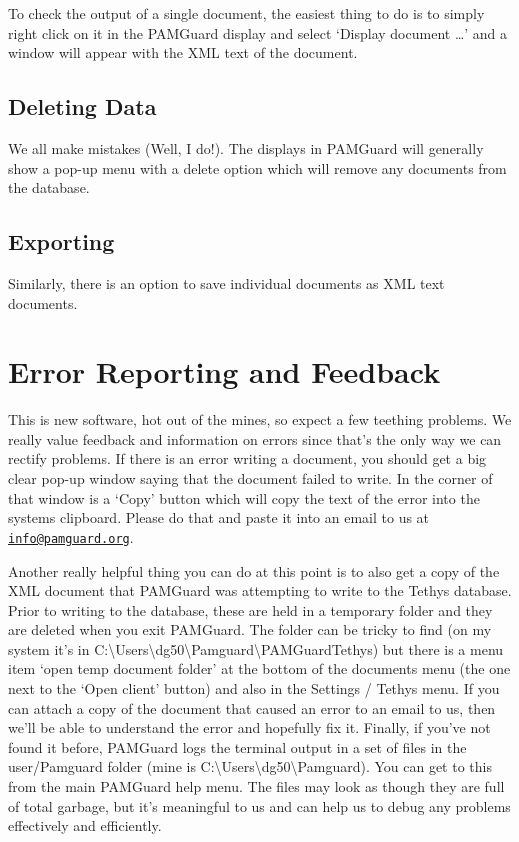 \documentclass[
]{article}
\begin{document}
To check the output of a single document, the easiest thing to do is to
simply right click on it in the PAMGuard display and select `Display
document \ldots{}' and a window will appear with the XML text of the
document.

\subsection{Deleting Data}\label{deleting-data}

We all make mistakes (Well, I do!). The displays in PAMGuard will
generally show a pop-up menu with a delete option which will remove any
documents from the database.

\subsection{Exporting}\label{exporting}

Similarly, there is an option to save individual documents as XML text
documents.

\section{Error Reporting and
Feedback}\label{error-reporting-and-feedback}

This is new software, hot out of the mines, so expect a few teething
problems. We really value feedback and information on errors since
that's the only way we can rectify problems. If there is an error
writing a document, you should get a big clear pop-up window saying that
the document failed to write. In the corner of that window is a `Copy'
button which will copy the text of the error into the systems clipboard.
Please do that and paste it into an email to us at
\href{mailto:info@pamguard.org}{\nolinkurl{info@pamguard.org}}.

Another really helpful thing you can do at this point is to also get a
copy of the XML document that PAMGuard was attempting to write to the
Tethys database. Prior to writing to the database, these are held in a
temporary folder and they are deleted when you exit PAMGuard. The folder
can be tricky to find (on my system it's in
C:\textbackslash Users\textbackslash dg50\textbackslash Pamguard\textbackslash PAMGuardTethys)
but there is a menu item `open temp document folder' at the bottom of
the documents menu (the one next to the `Open client' button) and also
in the Settings / Tethys menu. If you can attach a copy of the document
that caused an error to an email to us, then we'll be able to understand
the error and hopefully fix it. Finally, if you've not found it before,
PAMGuard logs the terminal output in a set of files in the user/Pamguard
folder (mine is
C:\textbackslash Users\textbackslash dg50\textbackslash Pamguard). You
can get to this from the main PAMGuard help menu. The files may look as
though they are full of total garbage, but it's meaningful to us and can
help us to debug any problems effectively and efficiently.
\end{document}
